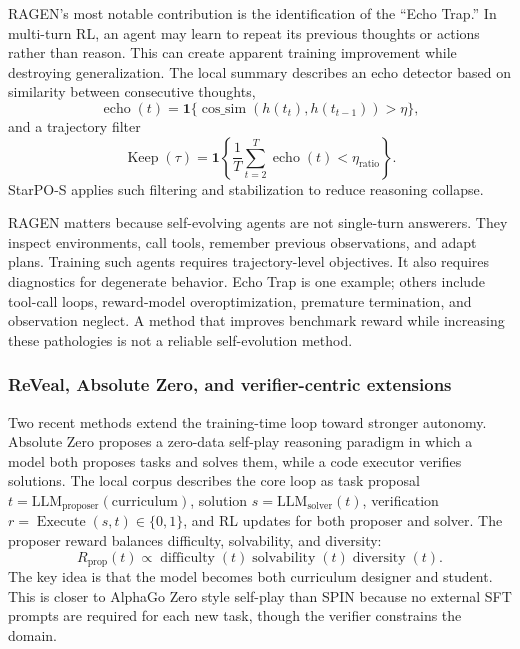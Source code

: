 RAGEN's most notable contribution is the identification of the ``Echo Trap.'' In multi-turn RL, an agent may learn to repeat its previous thoughts or actions rather than reason. This can create apparent training improvement while destroying generalization. The local summary describes an echo detector based on similarity between consecutive thoughts,
\begin{equation}
    \operatorname{echo}(t)=\mathbf{1}\{\operatorname{cos\_sim}(h(t_t),h(t_{t-1}))>\eta\},
\end{equation}
and a trajectory filter
\begin{equation}
    \operatorname{Keep}(\tau)=\mathbf{1}\left\{\frac{1}{T}\sum_{t=2}^{T}\operatorname{echo}(t)<\eta_{\mathrm{ratio}}\right\}.
\end{equation}
StarPO-S applies such filtering and stabilization to reduce reasoning collapse.

RAGEN matters because self-evolving agents are not single-turn answerers. They inspect environments, call tools, remember previous observations, and adapt plans. Training such agents requires trajectory-level objectives. It also requires diagnostics for degenerate behavior. Echo Trap is one example; others include tool-call loops, reward-model overoptimization, premature termination, and observation neglect. A method that improves benchmark reward while increasing these pathologies is not a reliable self-evolution method.

\subsubsection{ReVeal, Absolute Zero, and verifier-centric extensions}
\label{subsubsec:verifier-extensions}

Two recent methods extend the training-time loop toward stronger autonomy. Absolute Zero \cite{zhao2025absolute} proposes a zero-data self-play reasoning paradigm in which a model both proposes tasks and solves them, while a code executor verifies solutions. The local corpus describes the core loop as task proposal $t=\mathrm{LLM}_{\mathrm{proposer}}(\mathrm{curriculum})$, solution $s=\mathrm{LLM}_{\mathrm{solver}}(t)$, verification $r=\operatorname{Execute}(s,t)\in\{0,1\}$, and RL updates for both proposer and solver. The proposer reward balances difficulty, solvability, and diversity:
\begin{equation}
    R_{\mathrm{prop}}(t) \propto \operatorname{difficulty}(t)\operatorname{solvability}(t)\operatorname{diversity}(t).
\end{equation}
The key idea is that the model becomes both curriculum designer and student. This is closer to AlphaGo Zero style self-play than SPIN because no external SFT prompts are required for each new task, though the verifier constrains the domain.

